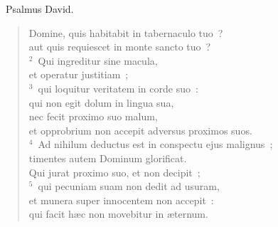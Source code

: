 ~\lettrine[lines=10,image=true,loversize=0.05,lraise=-0.03]{P}{}salmus David. \begin{flushleft}\begin{verse}\vspace{6pt}Domine, quis habitabit in tabernaculo tuo~?\\ aut quis requiescet in monte sancto tuo~?\\
${}^{2}$~Qui ingreditur sine macula,\\ et operatur justitiam~;\\
${}^{3}$~qui loquitur veritatem in corde suo~:\\ qui non egit dolum in lingua sua,\\ nec fecit proximo suo malum,\\ et opprobrium non accepit adversus proximos suos.\\
${}^{4}$~Ad nihilum deductus est in conspectu ejus malignus~;\\ timentes autem Dominum glorificat.\\ Qui jurat proximo suo, et non decipit~;\\
${}^{5}$~qui pecuniam suam non dedit ad usuram,\\ et munera super innocentem non accepit~:\\ qui facit h\ae c non movebitur in \ae ternum.\end{verse}\end{flushleft}


